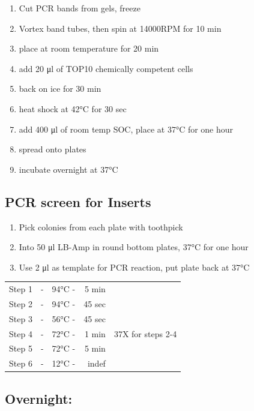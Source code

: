 \documentclass[
  letterpaper,
  DIV=11,
  numbers=noendperiod]{scrreprt}
\providecommand{\tightlist}{%
  \setlength{\itemsep}{0pt}\setlength{\parskip}{0pt}}\usepackage{longtable,booktabs,array}
\begin{document}
\begin{enumerate}
\def\labelenumi{\arabic{enumi}.}
\tightlist
\item
  Cut PCR bands from gels, freeze
\item
  Vortex band tubes, then spin at 14000RPM for 10 min
\item
  place at room temperature for 20 min
\item
  add 20 μl of TOP10 chemically competent cells
\item
  back on ice for 30 min
\item
  heat shock at 42°C for 30 sec
\item
  add 400 μl of room temp SOC, place at 37°C for one hour
\item
  spread onto plates
\item
  incubate overnight at 37°C
\end{enumerate}

\hypertarget{pcr-screen-for-inserts}{%
\subsection{PCR screen for Inserts}\label{pcr-screen-for-inserts}}

\begin{enumerate}
\def\labelenumi{\arabic{enumi}.}
\tightlist
\item
  Pick colonies from each plate with toothpick
\item
  Into 50 μl LB-Amp in round bottom plates, 37°C for one hour
\item
  Use 2 μl as template for PCR reaction, put plate back at 37°C
\end{enumerate}

\begin{longtable}[]{@{}lccrl@{}}
\toprule\noalign{}
\endhead
\bottomrule\noalign{}
\endlastfoot
Step 1 & - & 94°C - & 5 min & \\
Step 2 & - & 94°C - & 45 sec & \\
Step 3 & - & 56°C - & 45 sec & \\
Step 4 & - & 72°C - & 1 min & 37X for steps 2-4 \\
Step 5 & - & 72°C - & 5 min & \\
Step 6 & - & 12°C - & indef & \\
\end{longtable}

\hypertarget{overnight}{%
\subsection{Overnight:}\label{overnight}}
\end{document}
